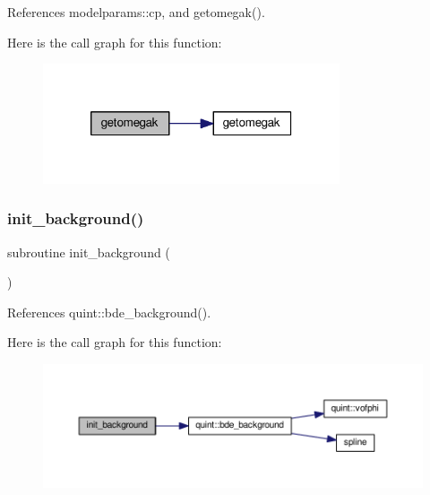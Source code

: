 References modelparams\+::cp, and getomegak().

Here is the call graph for this function\+:
\nopagebreak
\begin{figure}[H]
\begin{center}
\leavevmode
\includegraphics[width=248pt]{equations__bde__v3__nopert_8f90_a2c95a3b42a68aa87a21097ce3ff8bbe6_cgraph}
\end{center}
\end{figure}
\mbox{\label{equations__bde__v3__nopert_8f90_a47540f6082acc64c78a1daac45637fd6}} 
\subsubsection{\texorpdfstring{init\+\_\+background()}{init\_background()}}
{\footnotesize\ttfamily subroutine init\+\_\+background (\begin{DoxyParamCaption}{ }\end{DoxyParamCaption})}



References quint\+::bde\+\_\+background().

Here is the call graph for this function\+:
\nopagebreak
\begin{figure}[H]
\begin{center}
\leavevmode
\includegraphics[width=350pt]{equations__bde__v3__nopert_8f90_a47540f6082acc64c78a1daac45637fd6_cgraph}
\end{center}
\end{figure}
